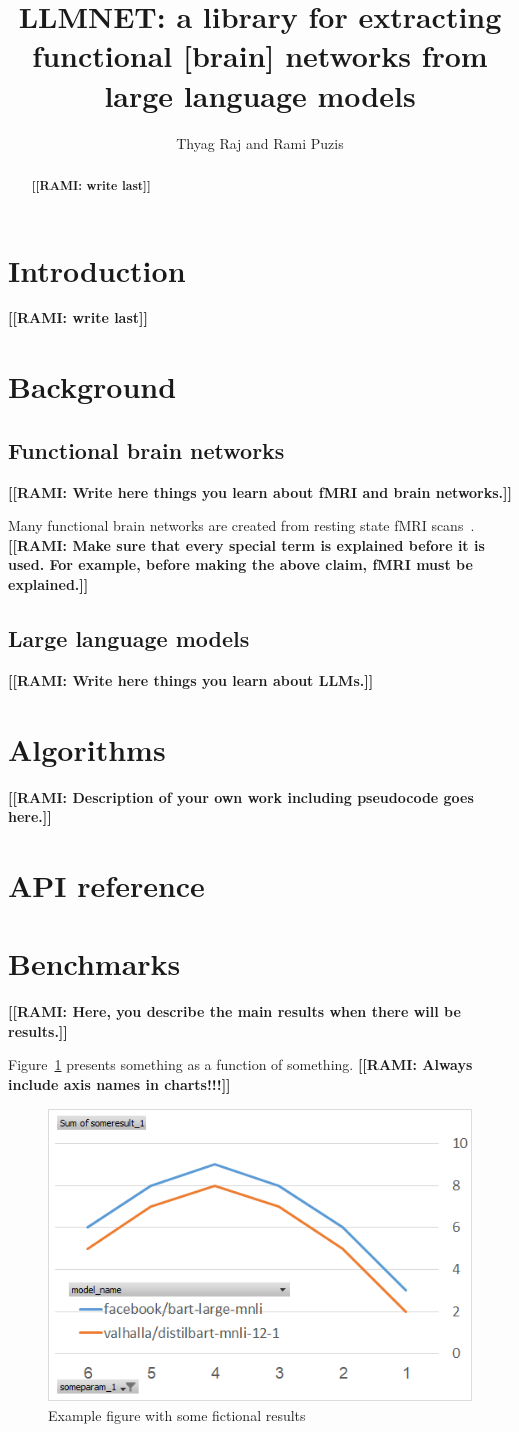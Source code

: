 \documentclass{article}
\title{LLMNET: a library for extracting functional [brain] networks from large language models}
\author{Thyag Raj and Rami Puzis}
\newcommand{\rami}[1]{\textbf{\color{red}[[RAMI: #1]]}}
\begin{document}
\maketitle


\begin{abstract}
\rami{write last}   
\end{abstract}

\section{Introduction}
\rami{write last}   




\section{Background}
\subsection{Functional brain networks}
\rami{Write here things you learn about fMRI and brain networks.}

Many functional brain networks are created from resting state fMRI scans~\cite{van2010exploring}. 
\rami{Make sure that every special term is explained before it is used. 
For example, before making the above claim, fMRI must be explained.}

\subsection{Large language models}
\rami{Write here things you learn about LLMs.}


\section{Algorithms}
\rami{Description of your own work including pseudocode goes here.}


\section{API reference}


\section{Benchmarks}
\rami{Here, you describe the main results when there will be results.}

Figure~\ref{fig:my_label} presents something as a function of something. 
\rami{Always include axis names in charts!!!}


\begin{figure}
    \centering
    \includegraphics[width=0.5\columnwidth]{results/example_chart.png}
    \caption{Example figure with some fictional results}
    \label{fig:my_label}
\end{figure}




\end{document}

